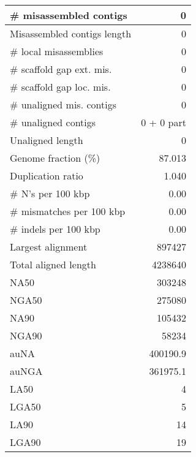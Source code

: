 \documentclass[12pt,a4paper]{article}
\begin{document}
\begin{table}[ht]
\begin{center}
\begin{tabular}{|l*{1}{|r}|}
\# misassembled contigs & 0 \\ \hline
Misassembled contigs length & 0 \\ \hline
\# local misassemblies & 0 \\ \hline
\# scaffold gap ext. mis. & 0 \\ \hline
\# scaffold gap loc. mis. & 0 \\ \hline
\# unaligned mis. contigs & 0 \\ \hline
\# unaligned contigs & 0 + 0 part \\ \hline
Unaligned length & 0 \\ \hline
Genome fraction (\%) & 87.013 \\ \hline
Duplication ratio & 1.040 \\ \hline
\# N's per 100 kbp & 0.00 \\ \hline
\# mismatches per 100 kbp & 0.00 \\ \hline
\# indels per 100 kbp & 0.00 \\ \hline
Largest alignment & 897427 \\ \hline
Total aligned length & 4238640 \\ \hline
NA50 & 303248 \\ \hline
NGA50 & 275080 \\ \hline
NA90 & 105432 \\ \hline
NGA90 & 58234 \\ \hline
auNA & 400190.9 \\ \hline
auNGA & 361975.1 \\ \hline
LA50 & 4 \\ \hline
LGA50 & 5 \\ \hline
LA90 & 14 \\ \hline
LGA90 & 19 \\ \hline
\end{tabular}
\end{center}
\end{table}
\end{document}
